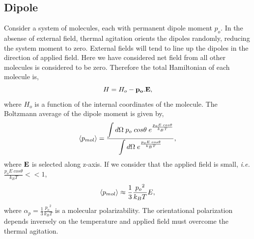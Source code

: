 \subsection{Dipole}
\label{subsec:boltzAverage-Dipole}
Consider a system of molecules, each with permanent dipole moment
$p_o$. In the absense of external field, thermal agitation orients the
dipoles randomly, reducing the system moment to zero.  External fields
will tend to line up the dipoles in the direction of applied field.
Here we have considered net field from all other molecules is
considered to be zero.  Therefore the total Hamiltonian of each
molecule is,\cite{Jackson98}
\begin{equation}
H = H_o - \bf{p_o} .\bf{E},
\end{equation}
where $H_o$ is a function of the internal coordinates of the molecule.
The Boltzmann average of the dipole moment is given by,
\begin{equation}
\braket{p_{mol}} = \frac{\displaystyle\int d\Omega\; p_o\; cos\theta\;  e^{\frac{p_oE\; cos\theta}{k_B T}}}{\displaystyle\int d\Omega\; e^{\frac{p_oE\;cos\theta}{k_B T}}},
\end{equation}
where $\bf{E}$ is selected along z-axis. If we consider that the
applied field is small, \textit{i.e.} $\frac{p_oE\; cos\theta}{k_B T} << 1$, 
\begin{equation}
\braket{p_{mol}}  \approx \frac{1}{3}\frac{{p_o}^2}{k_B T}E,
\end{equation}
where $ \alpha_p = \frac{1}{3}\frac{{p_o}^2}{k_B T}$ is a molecular
polarizability. The orientational polarization depends inversely on
the temperature and applied field must overcome the thermal agitation.

